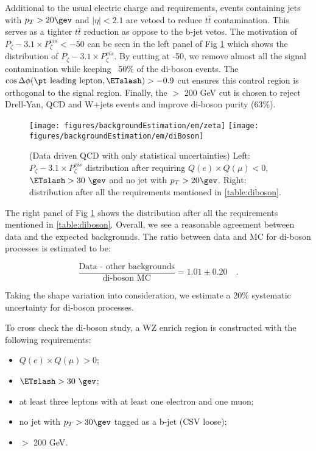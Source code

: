 Additional to the usual electric charge and \ETslash requirements, events containing 
jets with $p_T > 20\gev$ and $|\eta| < 2.1$ are vetoed to reduce $t\bar{t}$ 
contamination. This serves as a tighter $t\bar{t}$ reduction as oppose to the 
b-jet vetos. The motivation of $P_{\zeta}- 3.1 \times P_{\zeta}^{vis} < -50$ 
can be seen in the left panel of Fig \ref{fig:diBoson} which shows the 
distribution of $P_{\zeta}- 3.1 \times P_{\zeta}^{vis}$. By cutting at -50, 
we remove almost all the signal contamination while keeping ~50\% of the 
di-boson events. The $\cos{\Delta \phi (\pt\text{ leading lepton},\ETslash)} > -0.9$ 
cut ensures this control region is orthogonal to the signal region. Finally, 
the \meffemu $>$ 200 GeV cut is chosen to reject Drell-Yan, QCD and W+jets events 
and improve di-boson purity (63\%).

\begin{figure}\centering
  \texttt{[image: figures/backgroundEstimation/em/zeta]}
  \texttt{[image: figures/backgroundEstimation/em/diBoson]}
  \caption{\label{fig:diBoson} (Data driven QCD with only statistical uncertainties) 
Left: $P_{\zeta}- 3.1 \times P_{\zeta}^{vis}$ distribution after requiring $Q(e) \times Q(\mu) < 0$, 
$\ETslash>30~\gev$ and no jet with $p_T > 20\gev$. 
Right: \meffemu distribution after all the requirements mentioned in \ref{table:diboson}.}
\end{figure}

The right panel of Fig \ref{fig:diBoson} shows the \meffemu distribution after all 
the requirements mentioned in \ref{table:diboson}. Overall, we see a reasonable agreement 
between data and the expected backgrounds. The ratio between data and MC for di-boson 
processes is estimated to be:

\begin{equation}\label{eq:em_diboson}
\frac{\text{Data - other backgrounds}}{\text{di-boson MC}} = 1.01 \pm 0.20 \quad.
\end{equation}

Taking the shape variation into consideration, we estimate a 20\% systematic uncertainty 
for di-boson processes.

To cross check the di-boson study, a WZ enrich region is constructed 
with the following requirements:
\begin{itemize}\label{table:diboson2}
  \item $Q(e) \times Q(\mu) > 0$;
  \item $\ETslash>30~\gev$;
  \item at least three leptons with at least one electron and one muon;
  \item no jet with $p_T>30\gev$ tagged as a b-jet (CSV loose);
  \item \meffemu $>$ 200 GeV.
\end{itemize}

